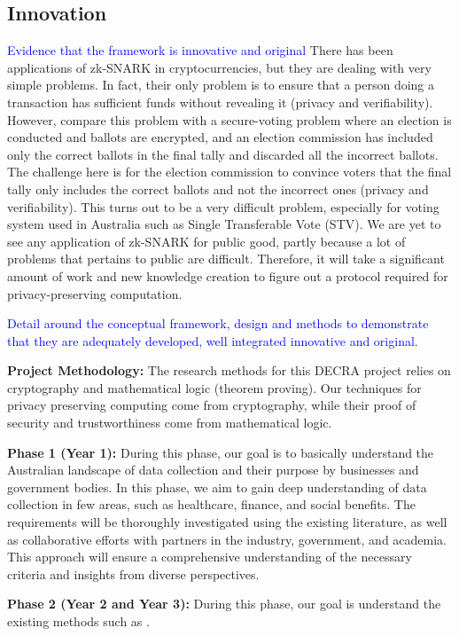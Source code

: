 \documentclass[12pt,a4paper]{article}
\newcommand{\rules}[1]{\textcolor{blue}{#1}}
\begin{document}
\subsection*{Innovation}
\rules{Evidence that the framework is innovative and original}
There has been applications of zk-SNARK in cryptocurrencies, but they 
are dealing with very simple problems. In fact, their only problem is 
to ensure that a person doing a transaction has sufficient funds without revealing it (privacy 
and verifiability). However, compare this problem with a secure-voting problem where 
an election is conducted and ballots are encrypted, and an election commission 
has included only the correct ballots in the final tally and discarded 
all the incorrect ballots. The challenge here is for the election commission 
to convince voters that the final tally only includes the correct ballots and 
not the incorrect ones (privacy and verifiability). This turns out 
to be a very difficult problem, especially for voting system used in Australia such 
as Single Transferable Vote (STV). We are yet to see any application of 
zk-SNARK for public good, partly because a lot of problems that pertains to public are difficult. 
Therefore, it will take a significant amount of work and new knowledge creation to figure out a 
protocol required for privacy-preserving computation.


\rules{Detail around the conceptual framework, design and methods to demonstrate that they 
are adequately developed, well integrated innovative and original.}

\textbf{Project Methodology:} The research methods for this DECRA project 
relies on cryptography and mathematical logic (theorem proving). Our 
techniques for privacy preserving computing come from cryptography, 
while their proof of security and trustworthiness come from mathematical logic. 

\textbf{Phase 1 (Year 1):}
During this phase, our goal is to basically understand the Australian landscape of 
data collection and their purpose by businesses and government bodies.
In this phase, we aim to gain deep understanding of data collection in few areas, such 
as healthcare, finance, and social benefits. 
The requirements will be thoroughly investigated using the 
existing literature, as well as collaborative efforts with partners in the 
industry, government, and academia. This approach will ensure a comprehensive 
understanding of the necessary criteria and insights from diverse perspectives.


\textbf{Phase 2 (Year 2 and Year 3):}
During this phase, our goal is understand the existing methods such as 
\cite{groth2016size, Bowe2019HaloRP, Gabizon2019PLONKPO}. 
\end{document}
